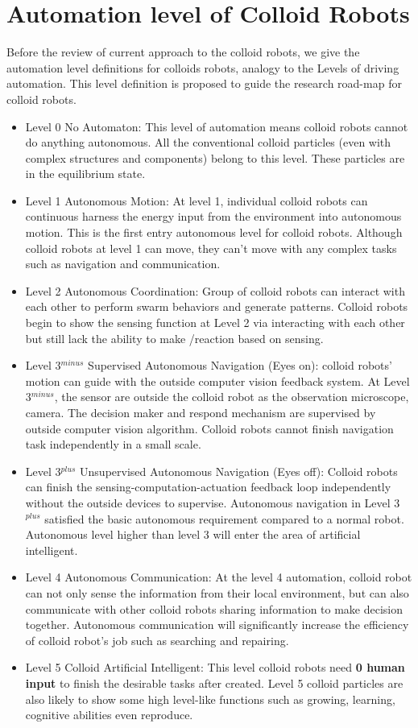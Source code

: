\section{Automation level of Colloid Robots}
Before the review of current approach to the colloid robots, 
we give the  automation level definitions for colloids robots,  analogy to the Levels of driving automation\cite{taeihagh2019governing}. This level definition is proposed to guide the research road-map for colloid robots.
\begin{itemize}
    \item Level 0 No Automaton: This level of automation means colloid robots cannot do anything autonomous. All the conventional colloid particles (even with complex structures and components) belong to this level. These particles are in the equilibrium state.
    \item Level 1 Autonomous  Motion: At level 1, individual colloid robots can continuous harness the energy input from the environment into autonomous motion. This is the first entry autonomous level for colloid robots. Although colloid robots at level 1 can move, they can't move with any complex tasks such as navigation and communication.
    \item Level 2 Autonomous Coordination: Group of colloid robots can interact with each other to perform swarm behaviors and generate patterns. Colloid robots begin to show the sensing function at Level 2 via interacting with each other but still lack the ability to make /reaction based on sensing. 
    \item Level 3$^{minus}$ Supervised Autonomous Navigation (Eyes on): colloid robots' motion can guide with the outside computer vision feedback system. At Level 3$^{minus}$, the sensor are outside the colloid robot as the observation microscope, camera. The decision maker and respond mechanism are supervised by outside computer vision algorithm. Colloid robots cannot finish navigation task independently in a small scale.
    \item Level 3$^{plus}$ Unsupervised Autonomous Navigation (Eyes off): Colloid robots can finish the sensing-computation-actuation feedback loop independently without the outside devices to supervise. Autonomous navigation in Level 3 $^{plus}$ satisfied the basic autonomous requirement compared to a normal robot. Autonomous level higher than level 3 will enter the area of artificial intelligent.
    \item Level 4 Autonomous Communication: At the level 4 automation, colloid robot can not only sense the information from their local environment, but can also communicate with other colloid robots sharing information to make decision together. Autonomous communication will significantly increase the efficiency of colloid robot's job such as searching and repairing.
    \item Level 5 Colloid Artificial Intelligent: This level colloid robots need \textbf{0 human input} to finish the desirable tasks after created. Level 5 colloid particles are also likely to show some high level-like functions such as 
    growing, learning, cognitive abilities  even reproduce.
\end{itemize}
